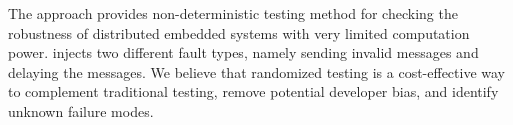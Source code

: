 The \approach{}  approach provides non-deterministic testing method for checking the robustness of distributed embedded systems %
with very limited computation power. \approach{} injects two different fault types, namely sending invalid messages and delaying the messages. We believe that randomized testing is a cost-effective way to complement traditional testing, remove potential  developer bias, and identify unknown failure modes. 





